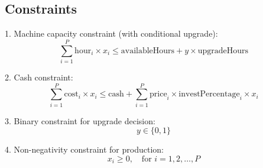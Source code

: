 \documentclass{article}
\begin{document}
\subsection*{Constraints}

1. Machine capacity constraint (with conditional upgrade):
\[
\sum_{i=1}^{P} \text{hour}_i \times x_i \leq \text{availableHours} + y \times \text{upgradeHours}
\]

2. Cash constraint:
\[
\sum_{i=1}^{P} \text{cost}_i \times x_i \leq \text{cash} + \sum_{i=1}^{P} \text{price}_i \times \text{investPercentage}_i \times x_i
\]

3. Binary constraint for upgrade decision:
\[
y \in \{0, 1\}
\]

4. Non-negativity constraint for production:
\[
x_i \geq 0, \quad \text{for } i = 1, 2, \ldots, P
\]
\end{document}
